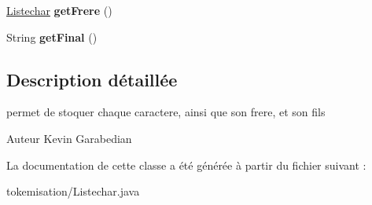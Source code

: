 \begin{DoxyCompactItemize}
\item 
\hyperlink{classtokemisation_1_1_listechar}{Listechar} {\bfseries get\+Frere} ()\hypertarget{classtokemisation_1_1_listechar_a51907515c716c508d49faeff3d0adc5b}{}\label{classtokemisation_1_1_listechar_a51907515c716c508d49faeff3d0adc5b}

\item 
String {\bfseries get\+Final} ()\hypertarget{classtokemisation_1_1_listechar_ab310a59ec0373dc564ad64188232d7ba}{}\label{classtokemisation_1_1_listechar_ab310a59ec0373dc564ad64188232d7ba}

\end{DoxyCompactItemize}


\subsection{Description détaillée}
permet de stoquer chaque caractere, ainsi que son frere, et son fils 

\begin{DoxyAuthor}{Auteur}
Kevin Garabedian 
\end{DoxyAuthor}


La documentation de cette classe a été générée à partir du fichier suivant \+:\begin{DoxyCompactItemize}
\item 
tokemisation/Listechar.\+java\end{DoxyCompactItemize}
